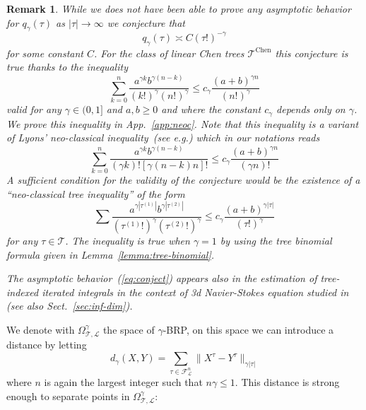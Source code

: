 \documentclass[a4paper,11pt,reqno]{article}
\newcommand{\1}{{\bf 1}}
\newcommand{\FF}{\mathcal{F}}
\newcommand{\LL}{\mathcal{L}}
\newcommand{\cl}{\mathcal L}
\newtheorem{remark}[theorem]{Remark}
\newcommand{\TT}{\mathcal{T}}
\begin{document}
\begin{remark}
\label{rem:q-asymp}
While we does not have been able to prove any asymptotic behavior for $q_\gamma(\tau)$ as $|\tau| \to \infty$ we conjecture that
\begin{equation}
  \label{eq:conject}
q_\gamma(\tau) \asymp C (\tau!)^{-\gamma}  
\end{equation}
for some constant $C$. For the class of linear Chen trees $\TT^{\text{Chen}}$ this conjecture is true thanks to the inequality
\begin{equation}
  \label{eq:neocx1}
\sum_{k=0}^n \frac{a^{\gamma k} b^{\gamma (n-k)}}{(k!)^\gamma (n!)^\gamma} \le c_\gamma \frac{(a+b)^{\gamma n}}{(n!)^\gamma}  
\end{equation}
valid for any $\gamma \in (0,1]$ and $a,b \ge 0$ and where the constant $c_\gamma$ depends only on $\gamma$. We prove this inequality in App.~\ref{app:neoc}. Note that this inequality is a variant of  Lyons' neo-classical inequality~(see e.g.\cite{MR1654527}) which in our notations reads
\begin{equation}
  \label{eq:neocxx1}
\sum_{k=0}^n \frac{a^{\gamma k} b^{\gamma (n-k)}}{(\gamma k)! [\gamma (n-k)n]!} \le c_\gamma \frac{(a+b)^{\gamma n}}{(\gamma n)!}  
\end{equation}
A sufficient condition for the validity of the conjecture would be the existence of a ``neo-classical tree inequality'' of the form
\begin{equation}
  \label{eq:neocx1-tree}
\sum \frac{a^{\gamma |\tau^{(1)}|} b^{\gamma |\tau^{(2)}|}}{(\tau^{(1)}!)^\gamma (\tau^{(2)}!)^\gamma} \le c_\gamma \frac{(a+b)^{\gamma |\tau|}}{(\tau !)^\gamma}  
\end{equation}
for any $\tau \in \TT$.
 The inequality is  true when $\gamma =1$ by using the tree binomial formula given in Lemma~\ref{lemma:tree-binomial}. 

The asymptotic behavior~(\ref{eq:conject}) appears also in the estimation of tree-indexed iterated integrals in the context of 3d Navier-Stokes equation studied in~\cite{MR2227041} (see also Sect.~\ref{sec:inf-dim}).
\end{remark}


We denote with $\Omega^\gamma_{\TT,\LL}$ the space of $\gamma$-BRP, on this
space we can introduce a distance by letting
$$
d_\gamma(X,Y) = \sum_{\tau \in \FF^n_\cl} \|X^\tau-Y^\tau\|_{\gamma|\tau|}
$$
where $n$ is again the largest integer such that $n\gamma \le 1$. This distance is strong enough to separate points in $\Omega^\gamma_{\TT,\LL}$: 
\end{document}

